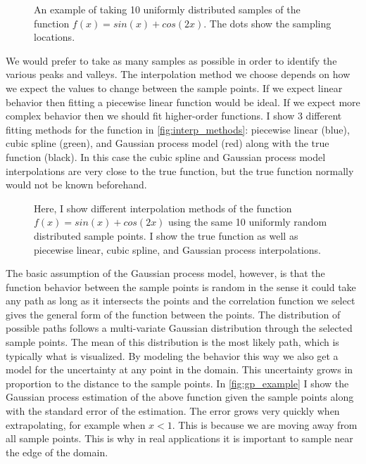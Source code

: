 \begin{figure}[htb]
  \centering
  
  \caption[The function $f(x) = sin(x) + cos(2x)$ uniformly sampled with 10 points]{%
    An example of taking 10 uniformly distributed samples of the function
    $f(x) = sin(x) + cos(2x)$.  The dots show the sampling locations.
  }
  \label{fig:reconstruction_sampling}
\end{figure}

We would prefer to take as many samples as possible in order to identify
the various peaks and valleys.
The interpolation method we choose depends on how we expect the values to
change between the sample points.
If we expect linear behavior then fitting a
piecewise linear function would be ideal.  If we expect more complex behavior
then we should fit higher-order functions.  I show 3 different fitting 
methods for the function in \autoref{fig:interp_methods}: piecewise linear (blue), 
cubic spline (green), and Gaussian process model (red) along with the true
function (black).  In this case the cubic spline and Gaussian process model
interpolations are very close to the true function, but the true function
normally would not be known beforehand.

\begin{figure}[htb]
  \centering
  
  \caption[Example of different interpretation methods]{%
    Here, I show different interpolation methods of the function
    $f(x) = sin(x) + cos(2x)$ using the same 10 uniformly random distributed
    sample points.  I show the true function as well as piecewise linear,
    cubic spline, and Gaussian process interpolations.
  }
  \label{fig:interp_methods}
\end{figure}

The basic assumption of the Gaussian process model, however, is that the
function behavior between the sample points is random in the sense it could
take any path as long as it intersects the points and the correlation function
we select gives the general form of the function between the points.
The distribution of possible paths follows a multi-variate Gaussian
distribution through the selected sample points.  The mean of this 
distribution is the most likely path, which is typically what is visualized.
By modeling the behavior this way we also get a model for the uncertainty
at any point in the domain.  This uncertainty grows in proportion to the
distance to the sample points.  In \autoref{fig:gp_example} I show the Gaussian
process estimation of the above function given the sample points along with
the standard error of the estimation.  The error grows very quickly when
extrapolating, for example when $x < 1$.  This is 
because we are moving away from all sample points.  This is why in real 
applications it is important to sample near the edge of the domain.

